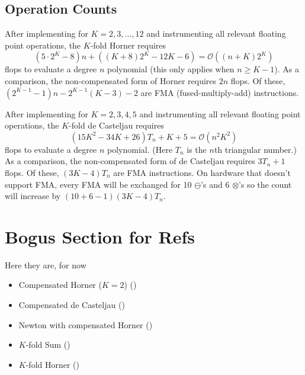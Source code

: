 \documentclass[letterpaper,10pt]{article}
\begin{document}
\subsection{Operation Counts}

After implementing for \(K = 2, 3, \ldots, 12\) and instrumenting all
relevant floating point operations, the \(K\)-fold Horner requires
\begin{equation}
(5 \cdot 2^K - 8)n + \left((K + 8) 2^K - 12K - 6\right) =
\mathcal{O}\left((n + K)2^K\right)
\end{equation}
flops to evaluate a degree \(n\) polynomial (this only applies when
\(n \geq K - 1\)). As a comparison, the
non-compensated form of Horner requires \(2n\) flops. Of these,
\(\left(2^{K - 1} - 1\right)n - 2^{K - 1}(K - 3) - 2\) are
FMA (fused-multiply-add) instructions.

After implementing for \(K = 2, 3, 4, 5\) and instrumenting all relevant
floating point operations, the \(K\)-fold de Casteljau requires
\begin{equation}
(15K^2 - 34K + 26)T_n + K + 5 =
\mathcal{O}\left(n^2 K^2\right)
\end{equation}
flops to evaluate a degree \(n\) polynomial. (Here \(T_n\) is the
\(n\)th triangular number.) As a comparison, the non-compensated form of
de Casteljau requires \(3 T_n + 1\) flops. Of these, \((3K - 4)T_n\) are
FMA instructions. On hardware that doesn't support FMA,
every FMA will be exchanged for 10 \(\ominus\)'s and 6 \(\otimes\)'s so the
count will increase by \((10 + 6 - 1)(3K - 4)T_n\).

\section{Bogus Section for Refs}

Here they are, for now
\begin{itemize}
  \item Compensated Horner (\(K = 2\)) (\cite{langlois_et_al:DSP:2006:442})
  \item Compensated de Casteljau (\cite{Jiang2010})
  \item Newton with compensated Horner (\cite{Graillat2008})
  \item \(K\)-fold Sum (\cite{Ogita2005})
  \item \(K\)-fold Horner (\cite{Graillat2009})
\end{itemize}



\end{document}

